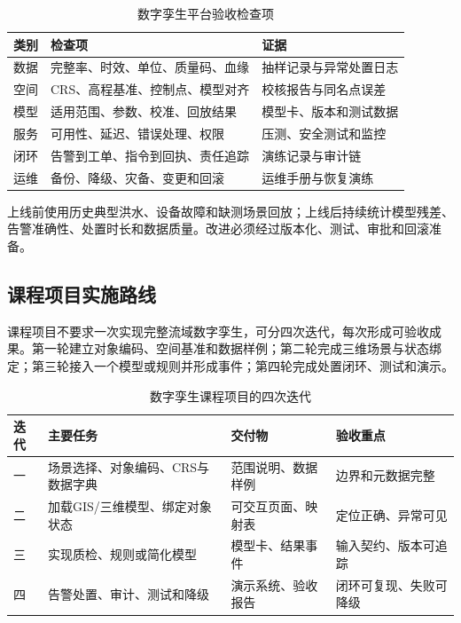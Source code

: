 \begin{table}[htbp]
\centering
\caption{数字孪生平台验收检查项}
\label{tab:dt-acceptance}
\begin{tabular}{p{2.3cm}p{5.0cm}p{5.4cm}}
\toprule
类别 & 检查项 & 证据 \\
\midrule
数据 & 完整率、时效、单位、质量码、血缘 & 抽样记录与异常处置日志 \\
空间 & CRS、高程基准、控制点、模型对齐 & 校核报告与同名点误差 \\
模型 & 适用范围、参数、校准、回放结果 & 模型卡、版本和测试数据 \\
服务 & 可用性、延迟、错误处理、权限 & 压测、安全测试和监控 \\
闭环 & 告警到工单、指令到回执、责任追踪 & 演练记录与审计链 \\
运维 & 备份、降级、灾备、变更和回滚 & 运维手册与恢复演练 \\
\bottomrule
\end{tabular}
\end{table}

上线前使用历史典型洪水、设备故障和缺测场景回放；上线后持续统计模型残差、告警准确性、处置时长和数据质量。改进必须经过版本化、测试、审批和回滚准备。

\subsection{课程项目实施路线}

课程项目不要求一次实现完整流域数字孪生，可分四次迭代，每次形成可验收成果。第一轮建立对象编码、空间基准和数据样例；第二轮完成三维场景与状态绑定；第三轮接入一个模型或规则并形成事件；第四轮完成处置闭环、测试和演示。

\begin{table}[htbp]
\centering
\caption{数字孪生课程项目的四次迭代}
\label{tab:dt-course-iterations}
\begin{tabular}{p{1.8cm}p{4.0cm}p{4.1cm}p{3.3cm}}
\toprule
迭代 & 主要任务 & 交付物 & 验收重点 \\
\midrule
一 & 场景选择、对象编码、CRS与数据字典 & 范围说明、数据样例 & 边界和元数据完整 \\
二 & 加载GIS/三维模型、绑定对象状态 & 可交互页面、映射表 & 定位正确、异常可见 \\
三 & 实现质检、规则或简化模型 & 模型卡、结果事件 & 输入契约、版本可追踪 \\
四 & 告警处置、审计、测试和降级 & 演示系统、验收报告 & 闭环可复现、失败可降级 \\
\bottomrule
\end{tabular}
\end{table}

